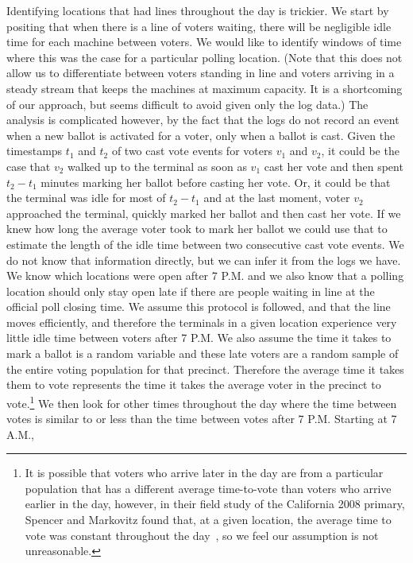 \documentclass[letterpaper,twocolumn,10pt]{article}
\begin{document}
Identifying locations that had lines throughout the day is trickier. We start by
positing that when there is a line of voters waiting, there will be negligible
idle time for each machine between voters. We would like to identify windows of
time where this was the case for a particular polling location. (Note that this
does not allow us to differentiate between voters standing in line and voters
arriving in a steady stream that keeps the machines at maximum capacity. It is a
shortcoming of our approach, but seems difficult to avoid given only the log
data.) The analysis is complicated however, by the fact that the logs do not
record an event when a new ballot is activated for a voter, only when a ballot
is cast. Given the timestamps $t_1$ and $t_2$ of two cast vote events for voters
$v_1$ and $v_2$, it could be the case that $v_2$ walked up to the terminal
as soon as $v_1$ cast her vote and then spent $t_2-t_1$ minutes marking her
ballot before casting her vote. Or, it could be that the terminal was idle for
most of $t_2-t_1$ and at the last moment, voter $v_2$ approached the terminal,
quickly marked her ballot and then cast her vote. If we knew how long the
average voter took to mark her ballot we could use that to estimate the length
of the idle time between two consecutive cast vote events. We do not know that
information directly, but we can infer it from the logs we have. We know which
locations were open after 7 P.M. and we also know that a polling location should
only stay open late if there are people waiting in line at the official poll
closing time. We assume this protocol is followed, and that
the line moves efficiently, and therefore the terminals in a given location
experience very little idle time between voters after 7 P.M. We also assume
the time it takes to mark a ballot is a random variable and these late voters
are a random sample of the entire voting population for that precinct. Therefore
the average time it takes them to vote represents the time it takes the average
voter in the precinct to vote.\footnote{It is possible that voters who arrive later in
the day are from a particular population that has a different average
time-to-vote than voters who arrive earlier in the day, however, in their field
study of the California 2008 primary, Spencer and Markovitz found that, at a
given location, the
average time to vote was constant throughout the day~\cite{Spencer2010}, so we
feel our assumption is not unreasonable.} We 
then look for other times throughout the day where the time between votes is
similar to or less than the time between votes after 7 P.M. Starting at 7 A.M.,
\end{document}
